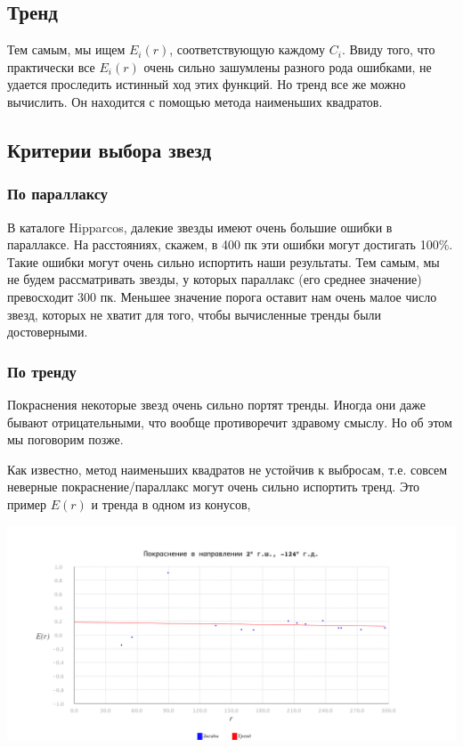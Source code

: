 \documentclass[14pt]{article}
\begin{document}
        \subsection{Тренд}
            Тем самым, мы ищем $E_i(r)$, соответствующую каждому $C_i$. Ввиду того, что практически все $E_i(r)$ очень сильно зашумлены разного рода ошибками, не удается проследить истинный ход этих функций. Но тренд все же можно вычислить. Он находится с помощью метода наименьших квадратов.  
            
        \subsection{Критерии выбора звезд}
            \subsubsection{По параллаксу}
                В каталоге Hipparcos, далекие звезды имеют очень большие ошибки в параллаксе. На расстояниях, скажем, в 400 пк эти ошибки могут достигать 100\%. Такие ошибки могут очень сильно испортить наши результаты. Тем самым, мы не будем рассматривать звезды, у которых параллакс (его среднее значение) превосходит 300 пк. Меньшее значение порога оставит нам очень малое число звезд, которых не хватит для того, чтобы вычисленные тренды были достоверными.
            \subsubsection{По тренду}
                Покраснения некоторые звезд очень сильно портят тренды. Иногда они даже бывают отрицательными, что вообще противоречит здравому смыслу. Но об этом мы поговорим позже.
                
                Как известно, метод наименьших квадратов не устойчив к выбросам, т.е. совсем неверные покраснение/параллакс могут очень сильно испортить тренд. Это пример $E(r)$ и тренда в одном из конусов, 
                \begin{center}
                    \includegraphics[scale=0.35]{ls.png}
                \end{center}
                
\end{document}
